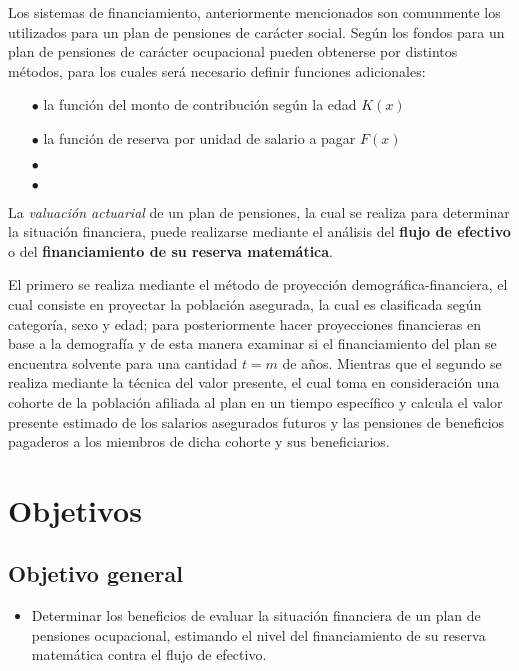 \documentclass[12pt,letterpaper,titlepage]{article}
\begin{document}
Los sistemas de financiamiento, anteriormente mencionados son comunmente los utilizados para un plan de pensiones de carácter social. Según \cite{778} los fondos para un plan de pensiones de carácter ocupacional pueden obtenerse por distintos métodos, para los cuales será necesario definir funciones adicionales:

\begin{itemize}
	\item [$\bullet$] la función del monto de contribución según la edad $K(x)$
	\item [$\bullet$] la función de reserva por unidad de salario a pagar $F(x)$
	\item [$\bullet$]
	\item [$\bullet$]
\end{itemize}

La \textit{valuación actuarial} de un plan de pensiones, la cual se realiza para determinar la situación financiera, puede realizarse mediante el análisis del \textbf{flujo de efectivo} o del \textbf{financiamiento de su reserva matemática}.

El primero se realiza mediante el método de proyección demográfica-financiera, el cual consiste en proyectar la población asegurada, la cual es clasificada según categoría, sexo y edad; para posteriormente hacer proyecciones financieras en base a la demografía y de esta manera examinar si el financiamiento del plan se encuentra solvente para una cantidad $t=m$ de años. Mientras que el segundo se realiza mediante la técnica del valor presente, el cual toma en consideración una cohorte de la población afiliada al plan en un tiempo específico y calcula el valor presente estimado de los salarios asegurados futuros y las pensiones de beneficios pagaderos a los miembros de dicha cohorte y sus beneficiarios.

\newpage

\section{Objetivos}


\subsection{Objetivo general}

\begin{itemize}
	\item Determinar los beneficios de evaluar la situación financiera de un plan de pensiones ocupacional, estimando el nivel del financiamiento de su reserva matemática contra el flujo de efectivo.
\end{itemize}
\end{document}
